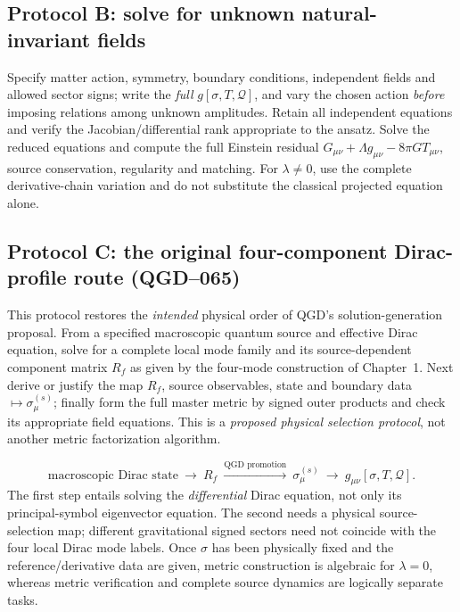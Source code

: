 \documentclass[11pt,a4paper]{article}
\begin{document}
\subsection{Protocol B: solve for unknown natural-invariant fields}
Specify matter action, symmetry, boundary conditions, independent fields and allowed sector signs; write the \emph{full} \(g[\sigma,T,\mathcal Q]\), and vary the chosen action \emph{before} imposing relations among unknown amplitudes. Retain all independent equations and verify the Jacobian/differential rank appropriate to the ansatz. Solve the reduced equations and compute the full Einstein residual \(G_{\mu\nu}+\Lambda g_{\mu\nu}-8\pi G T_{\mu\nu}\), source conservation, regularity and matching. For \(\lambda\ne0\), use the complete derivative-chain variation and do not substitute the classical projected equation alone.


\subsection{Protocol C: the original four-component Dirac-profile route (QGD--065)}\label{sec:qgd065-spinor-generator}
This protocol restores the \emph{intended} physical order of QGD's
solution-generation proposal.  From a specified macroscopic quantum source
and effective Dirac equation, solve for a complete local mode family and
its source-dependent component matrix $R_f$ as given by the four-mode construction of Chapter~1.  Next derive or justify
the map $R_f$, source observables, state and boundary data
$\mapsto\sigma_\mu^{(s)}$; finally form the full master metric by signed
outer products and check its appropriate field equations.  This is a
\emph{proposed physical selection protocol}, not another metric
factorization algorithm.

\begin{equation}\label{eq:qgd065-generator}
\boxed{\text{macroscopic Dirac state}\ \longrightarrow\ R_f\
\overset{\text{QGD promotion}}{\longrightarrow}\
\sigma_\mu^{(s)}\ \longrightarrow\ g_{\mu\nu}[\sigma,T,\mathcal Q].}
\end{equation}
The first step entails solving the \emph{differential} Dirac equation,
not only its principal-symbol eigenvector equation.  The second needs a
physical source-selection map; different gravitational signed sectors
need not coincide with the four local Dirac mode labels.  Once
$\sigma$ has been physically fixed and the reference/derivative data are
given, metric construction is algebraic for $\lambda=0$, whereas metric
verification and complete source dynamics are logically separate tasks.
\end{document}
